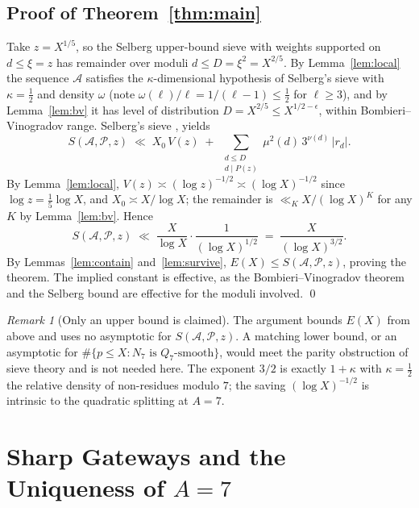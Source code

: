 \documentclass[12pt]{amsart}
\theoremstyle{definition}
\theoremstyle{remark}
\newtheorem{remark}[theorem]{Remark}
\begin{document}
\subsection{Proof of Theorem~\ref{thm:main}}

Take $z = X^{1/5}$, so the Selberg upper-bound sieve with weights
supported on $d \le \xi = z$ has remainder over moduli $d \le D = \xi^2 = X^{2/5}$.
By Lemma~\ref{lem:local} the sequence $\mathcal{A}$ satisfies the
$\kappa$-dimensional hypothesis of Selberg's sieve with $\kappa = \tfrac12$
and density $\omega$ (note $\omega(\ell)/\ell = 1/(\ell-1) \le \tfrac12$
for $\ell \ge 3$), and by Lemma~\ref{lem:bv} it has level of distribution
$D = X^{2/5} \le X^{1/2-\epsilon}$, within Bombieri--Vinogradov range.
Selberg's sieve
\cite[Thm.~2.2 and the $\kappa$-dimensional bound of \S2.4]{Halberstam-Richert},
\cite[Ch.~6]{Iwaniec-Kowalski} yields
\[
  S(\mathcal{A}, \mathcal{P}, z)
  \;\ll\; X_0\, V(z)
  \;+\; \sum_{\substack{d \le D \\ d \mid P(z)}}
  \mu^2(d)\, 3^{\nu(d)}\, |r_d|.
\]
By Lemma~\ref{lem:local}, $V(z) \asymp (\log z)^{-1/2}
\asymp (\log X)^{-1/2}$ since $\log z = \tfrac15 \log X$, and
$X_0 \asymp X/\log X$; the remainder is $\ll_K X/(\log X)^{K}$ for any
$K$ by Lemma~\ref{lem:bv}. Hence
\[
  S(\mathcal{A}, \mathcal{P}, z)
  \;\ll\; \frac{X}{\log X} \cdot \frac{1}{(\log X)^{1/2}}
  \;=\; \frac{X}{(\log X)^{3/2}}.
\]
By Lemmas~\ref{lem:contain} and~\ref{lem:survive},
$E(X) \le S(\mathcal{A}, \mathcal{P}, z)$, proving the theorem. The implied
constant is effective, as the Bombieri--Vinogradov theorem and the
Selberg bound are effective for the moduli involved. \qed

\begin{remark}[Only an upper bound is claimed]
The argument bounds $E(X)$ from above and uses no asymptotic for
$S(\mathcal{A}, \mathcal{P}, z)$. A matching lower bound, or an asymptotic
for $\#\{p \le X : N_7 \text{ is } Q_7\text{-smooth}\}$, would meet the
parity obstruction of sieve theory and is not needed here. The exponent
$3/2$ is exactly $1 + \kappa$ with $\kappa = \tfrac12$ the relative
density of non-residues modulo $7$; the saving $(\log X)^{-1/2}$ is
intrinsic to the quadratic splitting at $A = 7$.
\end{remark}

\section{Sharp Gateways and the Uniqueness of $A = 7$}\label{sec:sharp}
\end{document}
